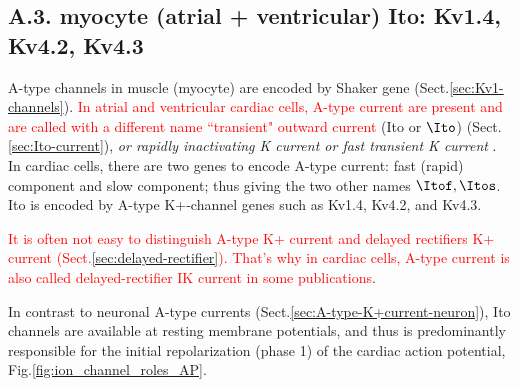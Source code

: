 \subsection{A.3. myocyte (atrial + ventricular) Ito: Kv1.4, Kv4.2, Kv4.3}
\label{sec:A-type-K+current-myocyte}

A-type channels in muscle (myocyte) are encoded by Shaker gene
(Sect.\ref{sec:Kv1-channels}).
\textcolor{red}{In atrial and ventricular cardiac cells, A-type current are
present and are called with a different name ``transient" outward current} (Ito
or $\Ito$) (Sect.\ref{sec:Ito-current}), {\it or rapidly inactivating K current
or fast transient K current} \citep{wang1998, wang1994, cai2007}. In cardiac
cells, there are two genes to encode A-type current: fast (rapid) component and
slow component; thus giving the two other names $\Itof, \Itos$. 
Ito is encoded by A-type K+-channel genes such as Kv1.4, Kv4.2, and Kv4.3.

\begin{mdframed}
\textcolor{red}{It is often not easy to distinguish A-type K+ current and
delayed rectifiers K+ current (Sect.\ref{sec:delayed-rectifier}). That's why in
cardiac cells, A-type current is also called delayed-rectifier IK current in
some publications}.
\end{mdframed}

In contrast to neuronal A-type currents
(Sect.\ref{sec:A-type-K+current-neuron}), Ito channels are available at resting
membrane potentials, and thus is predominantly responsible for the initial
repolarization (phase 1) of the cardiac action potential,
Fig.\ref{fig:ion_channel_roles_AP}.

